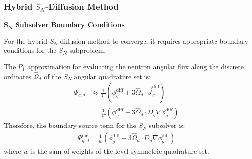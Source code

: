 \begin{frame}
  \frametitle{Hybrid $S_N$-Diffusion Method}
  \textbf{$\bm{S_N}$ Subsolver Boundary Conditions}
  \vspace{.2cm}

  For the hybrid $S_N$-diffusion method to converge, it requires appropriate boundary conditions for
  the $S_N$ subproblem.

  The $P_1$ approximation for evaluating the neutron angular flux along
  the discrete ordinates $\hat{\Omega}_d$ of the $S_N$ angular quadrature set is:
  \begin{align}
    \Psi_{g,d} &\approx \frac{1}{4\pi}\left(\phi^\text{diff}_g+3\hat{\Omega}_d\cdot
    \vec{J}^\text{diff}_g\right) \nonumber \\
    &=\frac{1}{4\pi}\left(\phi^\text{diff}_g-3\hat{\Omega}_d\cdot D_g\nabla\phi^\text{diff}_g\right)
  \end{align}
  Therefore, the boundary source term for the $S_N$ subsolver is:
  \begin{gather}
    \Psi^\text{inc}_{g,d} = \frac{1}{w}
    \left(\phi^\text{diff}_g-3\hat{\Omega}_d\cdot D_g\nabla\phi^\text{diff}_g\right)
  \end{gather}
  where $w$ is the sum of weights of the level-symmetric quadrature set.
\end{frame}

